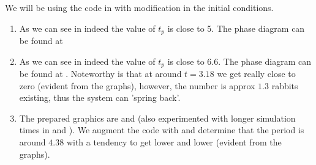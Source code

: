 \documentclass[a4paper, oneside]{article}
\begin{document}
\begin{solution}
    We will be using the code in  with modification in the initial conditions.
    \begin{enumerate}
        \item As we can see in  indeed the value of $t_p$ is close to 5. The phase diagram can be found at 
        \item As we can see in  indeed the value of $t_p$ is close to 6.6. The phase diagram can be found at . Noteworthy is that at around $t=3.18$ we get really close to zero (evident from the graphs), however, the number is approx $1.3$ rabbits existing, thus the system can 'spring back'.
        \item The prepared graphics are  and  (also experimented with longer simulation times in  and ). We augment the code with  and determine that the period is around $4.38$ with a tendency to get lower and lower (evident from the graphs).
    \end{enumerate}
\end{solution}

\appendix
\end{document}
